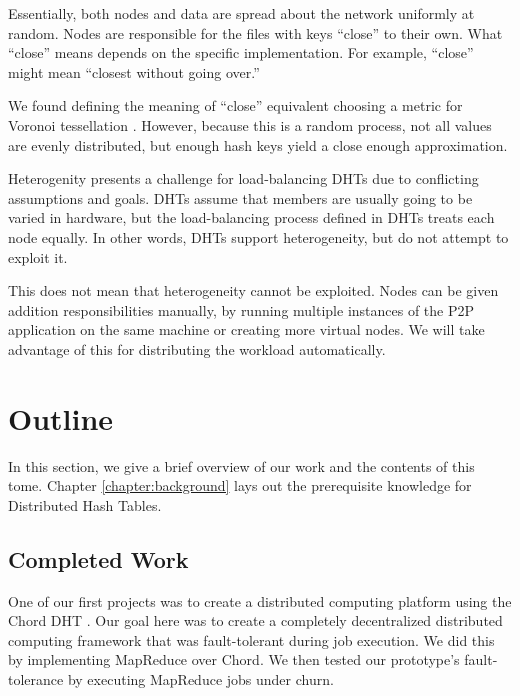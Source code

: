 Essentially, both nodes and data are spread about the network uniformly at random.
Nodes are responsible for the files with keys ``close'' to their own.
What ``close'' means depends on the specific implementation.
For example, ``close'' might mean ``closest without going over.''
 
We found defining the meaning of ``close'' equivalent choosing a metric for Voronoi tessellation \cite{vhash}.
However, because this is a random process, not all values are evenly distributed, but enough hash keys yield a close enough approximation.

Heterogenity presents a challenge for load-balancing DHTs due to conflicting assumptions and goals. 
DHTs assume that members are usually going to be varied in hardware, but the load-balancing process defined in DHTs treats each node equally.
In other words, DHTs support heterogeneity, but do not attempt to exploit it.

This does not mean that heterogeneity cannot be exploited.
Nodes can be given addition responsibilities manually, by running multiple instances of the P2P application on the same machine or creating more virtual nodes.
We will take advantage of this for distributing the workload automatically.


\section{Outline}

In this section, we give a brief overview of our work and the contents of this tome.
Chapter \ref{chapter:background} lays out the prerequisite knowledge for Distributed Hash Tables.
\subsection{Completed Work}

One of our first projects was to create a distributed computing platform using the Chord DHT \cite{chordreduce}.
Our goal here was to create a completely decentralized distributed computing framework that was fault-tolerant during job execution.
We did this by implementing MapReduce over Chord.
We then tested our prototype's fault-tolerance by executing MapReduce jobs under churn.

